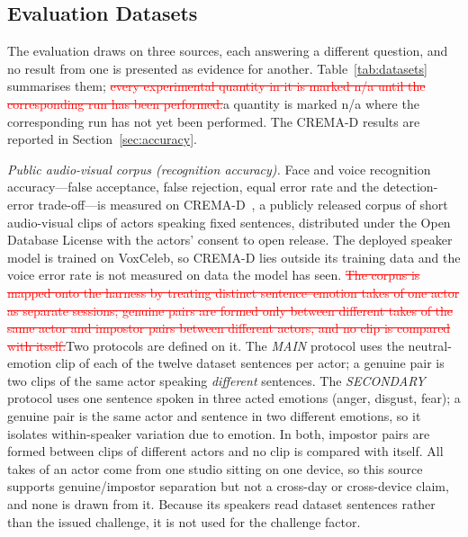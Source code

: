 \documentclass[10pt,journal,compsoc]{IEEEtran}
\begin{document}
{\color{revpink}
\subsection{Evaluation Datasets}\label{sec:datasets}
The evaluation draws on three sources, each answering a different question, and no result from one is presented as evidence for another. Table~\ref{tab:datasets} summarises them; \textcolor{red}{\sout{every experimental quantity in it is marked n/a until the corresponding run has been performed.}}\textcolor{revpink}{a quantity is marked n/a where the corresponding run has not yet been performed. The CREMA-D results are reported in Section~\ref{sec:accuracy}.}

\emph{Public audio-visual corpus (recognition accuracy).} Face and voice recognition accuracy---false acceptance, false rejection, equal error rate and the detection-error trade-off---is measured on CREMA-D~\cite{cao2014cremad}, a publicly released corpus of short audio-visual clips of actors speaking fixed sentences, distributed under the Open Database License with the actors' consent to open release. The deployed speaker model is trained on VoxCeleb, so CREMA-D lies outside its training data and the voice error rate is not measured on data the model has seen. \textcolor{red}{\sout{The corpus is mapped onto the harness by treating distinct sentence--emotion takes of one actor as separate sessions; genuine pairs are formed only between different takes of the same actor and impostor pairs between different actors, and no clip is compared with itself.}}\textcolor{revpink}{Two protocols are defined on it. The \emph{MAIN} protocol uses the neutral-emotion clip of each of the twelve dataset sentences per actor; a genuine pair is two clips of the same actor speaking \emph{different} sentences. The \emph{SECONDARY} protocol uses one sentence spoken in three acted emotions (anger, disgust, fear); a genuine pair is the same actor and sentence in two different emotions, so it isolates within-speaker variation due to emotion. In both, impostor pairs are formed between clips of different actors and no clip is compared with itself.} All takes of an actor come from one studio sitting on one device, so this source supports genuine/impostor separation but not a cross-day or cross-device claim, and none is drawn from it. Because its speakers read dataset sentences rather than the issued challenge, it is not used for the challenge factor.

}
\end{document}

